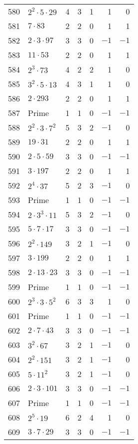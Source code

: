 \documentclass[12pt]{article}
\begin{document}
\begin{tabular}{|r|l|r|r|r|r|r|}
580 & $2^2 \cdot 5 \cdot 29$ & 4 & 3 & 1 & 1 & 0 \\
581 & $7 \cdot 83$ & 2 & 2 & 0 & 1 & 1 \\
582 & $2 \cdot 3 \cdot 97$ & 3 & 3 & 0 & $-1$ & $-1$ \\
583 & $11 \cdot 53$ & 2 & 2 & 0 & 1 & 1 \\
584 & $2^3 \cdot 73$ & 4 & 2 & 2 & 1 & 0 \\
585 & $3^2 \cdot 5 \cdot 13$ & 4 & 3 & 1 & 1 & 0 \\
586 & $2 \cdot 293$ & 2 & 2 & 0 & 1 & 1 \\
587 & Prime & 1 & 1 & 0 & $-1$ & $-1$ \\
588 & $2^2 \cdot 3 \cdot 7^2$ & 5 & 3 & 2 & $-1$ & 0 \\
589 & $19 \cdot 31$ & 2 & 2 & 0 & 1 & 1 \\
590 & $2 \cdot 5 \cdot 59$ & 3 & 3 & 0 & $-1$ & $-1$ \\
591 & $3 \cdot 197$ & 2 & 2 & 0 & 1 & 1 \\
592 & $2^4 \cdot 37$ & 5 & 2 & 3 & $-1$ & 0 \\
593 & Prime & 1 & 1 & 0 & $-1$ & $-1$ \\
594 & $2 \cdot 3^3 \cdot 11$ & 5 & 3 & 2 & $-1$ & 0 \\
595 & $5 \cdot 7 \cdot 17$ & 3 & 3 & 0 & $-1$ & $-1$ \\
596 & $2^2 \cdot 149$ & 3 & 2 & 1 & $-1$ & 0 \\
597 & $3 \cdot 199$ & 2 & 2 & 0 & 1 & 1 \\
598 & $2 \cdot 13 \cdot 23$ & 3 & 3 & 0 & $-1$ & $-1$ \\
599 & Prime & 1 & 1 & 0 & $-1$ & $-1$ \\
600 & $2^3 \cdot 3 \cdot 5^2$ & 6 & 3 & 3 & 1 & 0 \\
601 & Prime & 1 & 1 & 0 & $-1$ & $-1$ \\
602 & $2 \cdot 7 \cdot 43$ & 3 & 3 & 0 & $-1$ & $-1$ \\
603 & $3^2 \cdot 67$ & 3 & 2 & 1 & $-1$ & 0 \\
604 & $2^2 \cdot 151$ & 3 & 2 & 1 & $-1$ & 0 \\
605 & $5 \cdot 11^2$ & 3 & 2 & 1 & $-1$ & 0 \\
606 & $2 \cdot 3 \cdot 101$ & 3 & 3 & 0 & $-1$ & $-1$ \\
607 & Prime & 1 & 1 & 0 & $-1$ & $-1$ \\
608 & $2^5 \cdot 19$ & 6 & 2 & 4 & 1 & 0 \\
609 & $3 \cdot 7 \cdot 29$ & 3 & 3 & 0 & $-1$ & $-1$ \\

\end{tabular}
\end{document}
